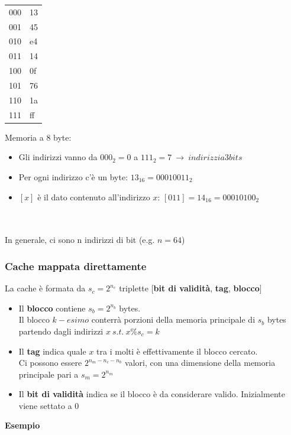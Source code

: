 \documentclass[12pt,a4paper]{article}
\begin{document}
\Sep
\begin{minipage}{.45\linewidth}
\begin{center}
\begin{tabular}{ll}
000 & {\color[HTML]{3166FF} 13} \\
001 & {\color[HTML]{3166FF} 45} \\
010 & {\color[HTML]{3166FF} e4} \\
011 & {\color[HTML]{3166FF} 14} \\
100 & {\color[HTML]{3166FF} 0f} \\
101 & {\color[HTML]{3166FF} 76} \\
110 & {\color[HTML]{3166FF} 1a} \\
111 & {\color[HTML]{3166FF} ff}
\end{tabular}
\end{center}
\end{minipage}
\begin{minipage}{.45\linewidth}
Memoria a 8 byte:
\begin{itemize}
\item Gli indirizzi vanno da $000_2 = 0$ a $111_2 = 7\ \rightarrow\ indirizzi a 3 bits$
\item Per ogni indirizzo c'è un byte: $13_{16} = 00010011_2$
\item $[x]$ è il dato contenuto all'indirizzo $x$: $[011] = 14_{16} = 00010100_2$
\end{itemize}
\end{minipage}\\
\\
In generale, ci sono n indirizzi di bit (e.g. $n = 64$)

\subsubsection{Cache mappata direttamente}
La cache è formata da $s_c = 2^{n_c}$ triplette $[$\textbf{bit di validità}, \textbf{tag}, \textbf{blocco}$]$\\
\begin{itemize}
\item Il \textbf{blocco} contiene $s_b = 2^{n_b}$ bytes.\\
Il blocco $k-esimo$ conterrà porzioni della memoria principale di $s_b$ bytes partendo dagli indirizzi $x\ s.t.\ x \% s_c = k$
\item Il \textbf{tag} indica quale $x$ tra i molti è effettivamente il blocco cercato.\\
Ci possono essere $2^{n_m-n_c-n_b}$ valori, con una dimensione della memoria principale pari a $s_m = 2^{n_m}$
\item Il \textbf{bit di validità} indica se il blocco è da considerare valido. Inizialmente viene settato a 0
\end{itemize}
\textbf{Esempio}\\
\end{document}
